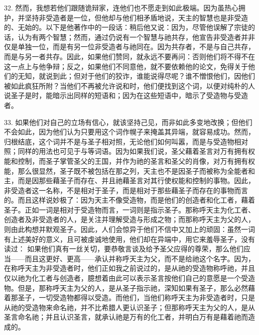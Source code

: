 32. 然而，我想若他们跟随诡辩家，连他们也不愿走到如此极端。因为虽热心拥护，并坚持非受造者是一位，但他却与他们相矛盾地说，天主的智慧也是非受造的、无始的。以下是他著作中的一段话：稍后他又说：因为，尽管他误解了宗徒的话，认为有两个智慧；然而，通过仍说有一个智慧与祂共存，他宣告非受造者并非仅是单独一位，而是有另一位非受造者与祂同在。因为共存者，不是与自己共存，而是与另一者共存。因此，如果他们赞同，就永远不要再问：否则他们将不得不在这一点上与他争辩；反之，如果他们不同意他，就不要依赖他的论文，免得关于他们的无知，就说到此；但对于他们的狡诈，谁能说得尽呢？谁不憎恨他们，因他们被如此疯狂所附？当他们不再被允许说和时，他们便找到这个词，以便对纯朴的人说圣子是时，能暗示出同样的短语和；因为在这些短语中，暗示了受造物与受造者。\par

33. 如果他们对自己的立场有信心，就该坚持己见，而非如此多变地改换；但他们不会如此，因为他们认为只要用这个词作幌子来掩盖其异端，就容易成功。然而，归根结底，这个词并不是与圣子相对照，无论他们如何叫嚣，而是与受造物相对照；同样的用法也可见于与等词语。因为如果我们说，圣父藉着圣言对万有拥有权能和控制，而圣子掌管圣父的王国，并作为祂的圣言和圣父的肖像，对万有拥有权能，那么很显然，圣子既不被包括在那之列，天主也不是因圣子而被称为全能者和主，而是因那些藉圣子而存在、并且祂藉圣言对其行使权能和控制的事物。因此，非受造者这一名称，不是相对于圣子，而是相对于那些藉圣子而存在的事物而言的。而且这样说妙极了：因为天主不像受造物，而是他们的创造者和化工者，藉着圣子。正如一词是相对于受造物而言，一词则是指示圣子。那称呼天主为化工者、创造者及非受造者的人，是关注并理解受造与形成之物；而那称呼天主为父的人，则由此构想并默观圣子。因此，人们会惊异于他们不信中又加上的顽固：虽然一词有上述美好的意义，且可被虔诚地使用，他们却在异端中，用它来羞辱圣子，没有读过： 如果他们真有一丝关切，要恭敬言谈及给予圣父应得的尊荣，那么他们应当——而且这更好、更高——承认并称呼天主为父，而不是给祂这个名字。因为，在称呼天主为非受造者时，他们正如我之前说过的，是从祂的受造物称呼祂，并且仅以祂为化工者与创造者，臆想着由此可以表示圣言按他们自己的意愿是一个受造物。但是，那称呼天主为父的人，是从圣子指示祂，深知如果有圣子，那么必然藉着那圣子，一切受造物都得以受造。而他们，当他们称呼天主为非受造者时，只是从祂的受造物来命名祂，并不比希腊人更认识圣子；但那称呼天主为父的人，是从圣言命名祂；并且认识圣言，就承认祂是万有的化工者，并明白万有是藉着祂而造成的。\par

